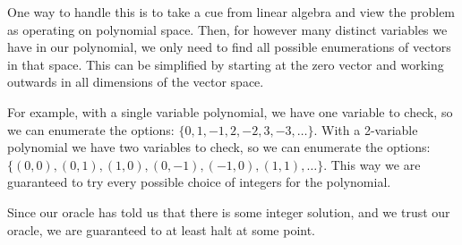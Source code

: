 \documentclass[12pt,letterpaper]{article}
\begin{document}
\begin{enumerate}
\begin{enumerate}
          One way to handle this is to take a cue from linear algebra and view the problem as operating on polynomial space.
          Then, for however many distinct variables we have in our polynomial, we only need to find all possible enumerations of vectors in that space.
          This can be simplified by starting at the zero vector and working outwards in all dimensions of the vector space.

          For example, with a single variable polynomial, we have one variable to check, so we can enumerate the options:
          $\{0, 1, -1, 2, -2, 3, -3, \dots\}$. With a 2-variable polynomial we have two variables to check, so we can enumerate the options:
          $\{(0, 0), (0, 1), (1, 0), (0, -1), (-1, 0), (1, 1), \dots\}$.
          This way we are guaranteed to try every possible choice of integers for the polynomial.

          Since our oracle has told us that there is some integer solution, and we trust our oracle, we are guaranteed to at least halt at some point.
      \end{enumerate}
  \end{enumerate}
\end{document}
